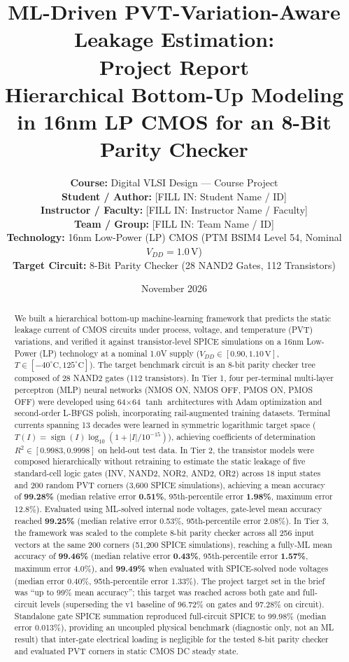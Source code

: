 \documentclass[11pt,a4paper]{article}
\title{\textbf{\LARGE ML-Driven PVT-Variation-Aware Leakage Estimation:\\Project Report}\\[0.5em]
\large Hierarchical Bottom-Up Modeling in 16nm LP CMOS for an 8-Bit Parity Checker}
\author{
\textbf{Course:} Digital VLSI Design --- Course Project\\[0.2em]
\textbf{Student / Author:} [FILL IN: Student Name / ID]\\[0.2em]
\textbf{Instructor / Faculty:} [FILL IN: Instructor Name / Faculty]\\[0.2em]
\textbf{Team / Group:} [FILL IN: Team Name / ID]\\[0.2em]
\textbf{Technology:} 16nm Low-Power (LP) CMOS (PTM BSIM4 Level 54, Nominal $V_{DD} = 1.0\,\mathrm{V}$)\\[0.2em]
\textbf{Target Circuit:} 8-Bit Parity Checker (28 NAND2 Gates, 112 Transistors)
}
\date{November 2026}
\numberwithin{table}{section}
\numberwithin{figure}{section}
\begin{document}
\maketitle

\begin{abstract}
We built a hierarchical bottom-up machine-learning framework that predicts the static leakage current of CMOS circuits under process, voltage, and temperature (PVT) variations, and verified it against transistor-level SPICE simulations on a 16nm Low-Power (LP) technology at a nominal 1.0V supply ($V_{DD} \in [0.90, 1.10\,\mathrm{V}]$, $T \in [-40^\circ\mathrm{C}, 125^\circ\mathrm{C}]$). The target benchmark circuit is an 8-bit parity checker tree composed of 28 NAND2 gates (112 transistors). In Tier 1, four per-terminal multi-layer perceptron (MLP) neural networks (NMOS ON, NMOS OFF, PMOS ON, PMOS OFF) were developed using 64$\times$64 $\tanh$ architectures with Adam optimization and second-order L-BFGS polish, incorporating rail-augmented training datasets. Terminal currents spanning 13 decades were learned in symmetric logarithmic target space ($T(I) = \operatorname{sign}(I)\log_{10}(1 + |I|/10^{-15})$), achieving coefficients of determination $R^2 \in [0.9983, 0.9998]$ on held-out test data. In Tier 2, the transistor models were composed hierarchically without retraining to estimate the static leakage of five standard-cell logic gates (INV, NAND2, NOR2, AND2, OR2) across 18 input states and 200 random PVT corners (3,600 SPICE simulations), achieving a mean accuracy of \textbf{99.28\%} (median relative error \textbf{0.51\%}, 95th-percentile error \textbf{1.98\%}, maximum error 12.8\%). Evaluated using ML-solved internal node voltages, gate-level mean accuracy reached \textbf{99.25\%} (median relative error 0.53\%, 95th-percentile error 2.08\%). In Tier 3, the framework was scaled to the complete 8-bit parity checker across all 256 input vectors at the same 200 corners (51,200 SPICE simulations), reaching a fully-ML mean accuracy of \textbf{99.46\%} (median relative error \textbf{0.43\%}, 95th-percentile error \textbf{1.57\%}, maximum error 4.0\%), and \textbf{99.49\%} when evaluated with SPICE-solved node voltages (median error 0.40\%, 95th-percentile error 1.33\%). The project target set in the brief was ``up to 99\% mean accuracy''; this target was reached across both gate and full-circuit levels (superseding the v1 baseline of 96.72\% on gates and 97.28\% on circuit). Standalone gate SPICE summation reproduced full-circuit SPICE to 99.98\% (median error 0.013\%), providing an uncoupled physical benchmark (diagnostic only, not an ML result) that inter-gate electrical loading is negligible for the tested 8-bit parity checker and evaluated PVT corners in static CMOS DC steady state.
\end{abstract}
\end{document}
